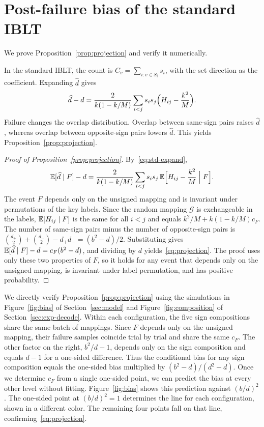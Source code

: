\section{Post-failure bias of the standard IBLT}\label{app:std}
We prove Proposition~\ref{prop:projection} and verify it numerically.

In the standard IBLT, the count is $C_v=\sum_{i:v\in S_i}s_i$, with the set direction as the coefficient. Expanding $\widehat d$ gives
\begin{equation}
\widehat d-d=\frac{2}{k(1-k/M)}\sum_{i<j}s_is_j\Bigl(H_{ij}-\frac{k^2}{M}\Bigr).\label{eq:std-expand}
\end{equation}
Failure changes the overlap distribution. Overlap between same-sign pairs raises $\widehat d$, whereas overlap between opposite-sign pairs lowers $\widehat d$. This yields Proposition~\ref{prop:projection}.

\begin{proof}[Proof of Proposition~\ref{prop:projection}]
By~\eqref{eq:std-expand},
\begin{equation*}
\mathbb E[\widehat d\mid F]-d=\frac{2}{k(1-k/M)}\sum_{i<j}s_is_j\,\mathbb E\Bigl[H_{ij}-\frac{k^2}{M}\Bigm|F\Bigr].
\end{equation*}
The event $F$ depends only on the unsigned mapping and is invariant under permutations of the key labels. Since the random mapping $\mathcal G$ is exchangeable in the labels, $\mathbb E[H_{ij}\mid F]$ is the same for all $i<j$ and equals $k^2/M+k(1-k/M)c_F$. The number of same-sign pairs minus the number of opposite-sign pairs is $\binom{d_+}2+\binom{d_-}2-d_+d_-=(b^2-d)/2$. Substituting gives $\mathbb E[\widehat d\mid F]-d=c_F(b^2-d)$, and dividing by $d$ yields~\eqref{eq:projection}. The proof uses only these two properties of $F$, so it holds for any event that depends only on the unsigned mapping, is invariant under label permutation, and has positive probability.
\end{proof}

We directly verify Proposition~\ref{prop:projection} using the simulations in Figure~\ref{fig:bias} of Section~\ref{sec:model} and Figure~\ref{fig:composition} of Section~\ref{sec:exp-decode}. Within each configuration, the five sign compositions share the same batch of mappings. Since $F$ depends only on the unsigned mapping, their failure samples coincide trial by trial and share the same $c_F$. The other factor on the right, $b^2/d-1$, depends only on the sign composition and equals $d-1$ for a one-sided difference. Thus the conditional bias for any sign composition equals the one-sided bias multiplied by $(b^2-d)/(d^2-d)$. Once we determine $c_F$ from a single one-sided point, we can predict the bias at every other level without fitting. Figure~\ref{fig:bias} shows this prediction against $(b/d)^2$. The one-sided point at $(b/d)^2=1$ determines the line for each configuration, shown in a different color. The remaining four points fall on that line, confirming~\eqref{eq:projection}.

